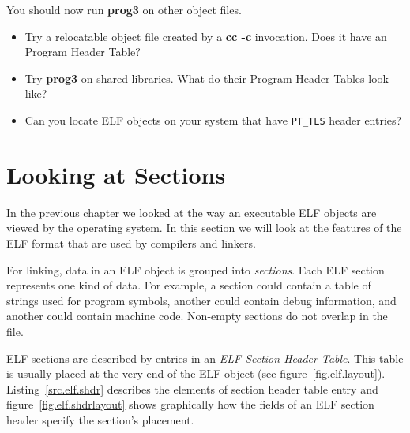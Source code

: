\documentclass[a4paper]{book}
\newcommand{\constant}[1]{\texttt{#1}}
\newcommand{\firstterm}[1]{\textit{#1}}                 %
\newcommand{\tool}[1]{\textbf{#1}}
\begin{document}
You should now run \tool{prog3} on other object files.

\begin{itemize}
\item Try a relocatable object file created by a \tool{cc -c}
  invocation.  Does it have an Program Header Table?
\item Try \tool{prog3} on shared libraries.  What do their Program
  Header Tables look like?
\item Can you locate ELF objects on your system that have
  \constant{PT\_TLS} header entries?
\end{itemize}

\chapter{Looking at Sections}\label{chap.elf-sections}

In the previous chapter we looked at the way an executable ELF objects
are viewed by the operating system.  In this section we will look at
the features of the ELF format that are used by compilers and linkers.

For linking, data in an ELF object is grouped into
\firstterm{sections}.  Each ELF section represents one kind of data.
For example, a section could contain a table of strings used for
program symbols, another could contain debug information, and another
could contain machine code.  Non-empty sections do not overlap in the
file.

ELF sections are described by entries in an \firstterm{ELF Section
  Header Table}.  This table is usually placed at the very end of the
ELF object (see figure~\vref{fig.elf.layout}).
Listing~\vref{src.elf.shdr} describes the elements of section header
table entry and figure~\vref{fig.elf.shdrlayout} shows graphically how
the fields of an ELF section header specify the section's placement.
\end{document}
